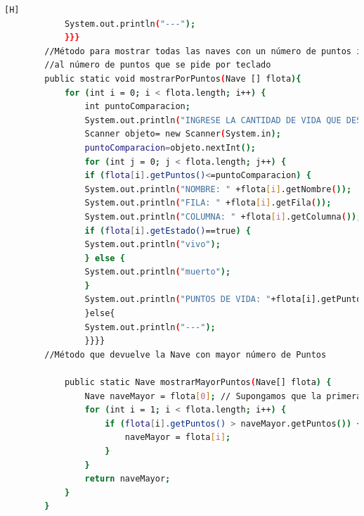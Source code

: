 \documentclass{article}
\begin{document}
\begin{lstlisting}[language=bash,caption={Creando la clase principal de DemoBatalla_v2.java}][H]
			System.out.println("---");
			}}}
		//Método para mostrar todas las naves con un número de puntos inferior o igual
		//al número de puntos que se pide por teclado
		public static void mostrarPorPuntos(Nave [] flota){
			for (int i = 0; i < flota.length; i++) {
				int puntoComparacion;
				System.out.println("INGRESE LA CANTIDAD DE VIDA QUE DESEA COMPARAR");
				Scanner objeto= new Scanner(System.in);
				puntoComparacion=objeto.nextInt();
				for (int j = 0; j < flota.length; j++) {
				if (flota[i].getPuntos()<=puntoComparacion) {
				System.out.println("NOMBRE: " +flota[i].getNombre());
				System.out.println("FILA: " +flota[i].getFila());
				System.out.println("COLUMNA: " +flota[i].getColumna());
				if (flota[i].getEstado()==true) {
				System.out.println("vivo");
				} else {
				System.out.println("muerto");
				}
				System.out.println("PUNTOS DE VIDA: "+flota[i].getPuntos());
				}else{
				System.out.println("---");
				}}}}
		//Método que devuelve la Nave con mayor número de Puntos

			public static Nave mostrarMayorPuntos(Nave[] flota) {
			    Nave naveMayor = flota[0]; // Supongamos que la primera nave tiene la mayor cantidad de puntos inicialmente
			    for (int i = 1; i < flota.length; i++) {
			        if (flota[i].getPuntos() > naveMayor.getPuntos()) {
			            naveMayor = flota[i];
			        }
			    }
			    return naveMayor;
			}
		}
		
	\end{lstlisting}
\end{document}
